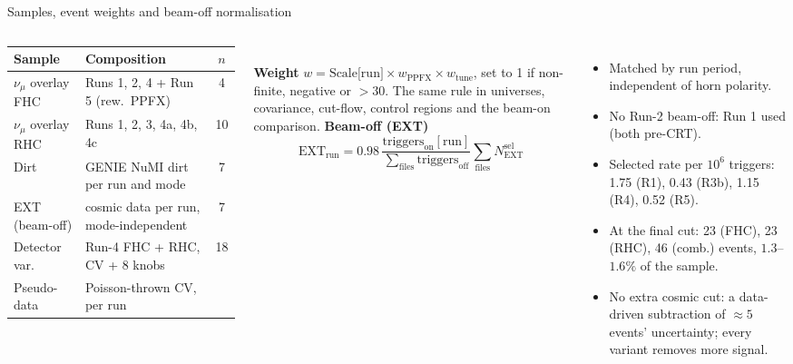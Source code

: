 \documentclass[aspectratio=169,10pt]{beamer}
\begin{document}
\begin{frame}{Samples, event weights and beam-off normalisation}
  \begin{columns}[T]
  \scriptsize\setlength{\tabcolsep}{2pt}
  \begin{tabular}{@{}p{2.2cm}p{3.9cm}c@{}}
    \toprule
    Sample & Composition & $n$ \\\midrule
    $\nu_\mu$ overlay FHC & Runs 1, 2, 4 + Run 5 (rew.\ PPFX) & 4 \\
    $\nu_\mu$ overlay RHC & Runs 1, 2, 3, 4a, 4b, 4c & 10 \\
    Dirt & GENIE NuMI dirt per run and mode & 7 \\
    EXT (beam-off) & cosmic data per run, mode-independent & 7 \\
    Detector var. & Run-4 FHC + RHC, CV + 8 knobs & 18 \\
    Pseudo-data & Poisson-thrown CV, per run & \\
    \bottomrule
  \end{tabular}\\[2mm]
  \textbf{Weight}\; $w=\text{Scale[run]}\times w_\mathrm{PPFX}\times w_\mathrm{tune}$,\;
  set to 1 if non-finite, negative or $>30$. The same rule in universes, covariance, cut-flow, control
  regions and the beam-on comparison.
  \scriptsize
  \textbf{Beam-off (EXT)}
  \[\text{EXT}_\text{run}=0.98\,\frac{\text{triggers}_\text{on}[\text{run}]}{\sum_\text{files}\text{triggers}_\text{off}}\sum_\text{files}N^\text{sel}_\text{EXT}\]
  \begin{itemize}\setlength\itemsep{1pt}
    \item Matched by run period, independent of horn polarity.
    \item No Run-2 beam-off: Run 1 used (both pre-CRT).
    \item Selected rate per $10^6$ triggers: 1.75 (R1), 0.43 (R3b), 1.15 (R4), 0.52 (R5).
    \item At the final cut: 23 (FHC), 23 (RHC), 46 (comb.) events, $1.3$--$1.6\%$ of the sample.
    \item No extra cosmic cut: a data-driven subtraction of $\approx5$ events' uncertainty; every variant removes more signal.
  \end{itemize}
  \end{columns}
\end{frame}

\end{document}
